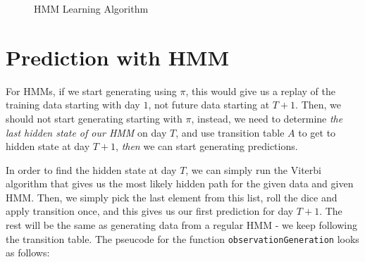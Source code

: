 \begin{figure}[!hbp]
\caption{HMM Learning Algorithm}
\vspace{0.6cm}
\end{figure}

\section{Prediction with HMM}

For HMMs, if we start generating using $\pi$, this would give us a replay of the
training data starting with day $1$, not future data starting at $T+1$. Then, we
should not start generating starting with $\pi$, instead, we need to determine
{\em the last hidden state of our HMM} on day $T$, and use transition table $A$
to get to hidden state at day $T+1$, {\em then} we can start generating predictions.

In order to find the hidden state at day $T$, we can simply run the Viterbi
algorithm that gives us the most likely hidden path for the given data and given
HMM. Then, we simply pick the last element from this list, roll the dice and
apply transition once, and this gives us our first prediction for day $T+1$. The
rest will be the same as generating data from a regular HMM - we keep following
the transition table. The pseucode for the function
\verb!observationGeneration!  looks as follows:

